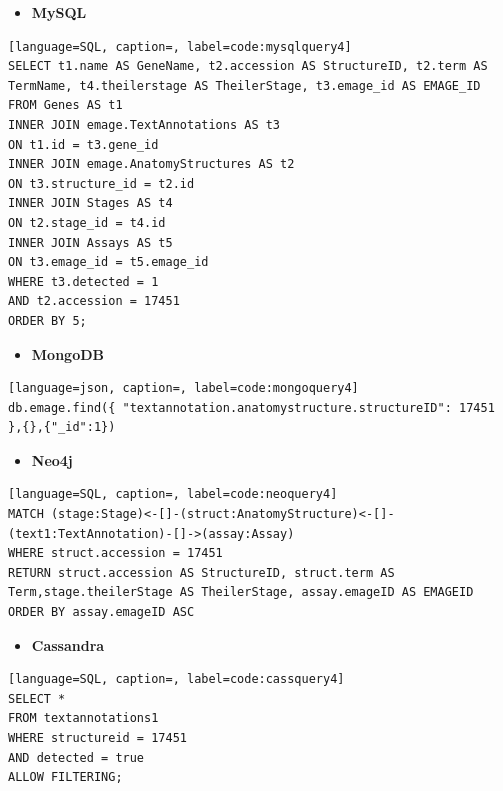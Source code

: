 \begin{itemize}[leftmargin=*]
\item \textbf{MySQL}
\end{itemize}

\begin{lstlisting}[language=SQL, caption=, label=code:mysqlquery4]
SELECT t1.name AS GeneName, t2.accession AS StructureID, t2.term AS TermName, t4.theilerstage AS TheilerStage, t3.emage_id AS EMAGE_ID
FROM Genes AS t1
INNER JOIN emage.TextAnnotations AS t3
ON t1.id = t3.gene_id
INNER JOIN emage.AnatomyStructures AS t2
ON t3.structure_id = t2.id
INNER JOIN Stages AS t4
ON t2.stage_id = t4.id
INNER JOIN Assays AS t5
ON t3.emage_id = t5.emage_id
WHERE t3.detected = 1
AND t2.accession = 17451
ORDER BY 5;
\end{lstlisting}

\begin{itemize}[leftmargin=*]
\item \textbf{MongoDB}
\end{itemize}

\begin{lstlisting}[language=json, caption=, label=code:mongoquery4]
db.emage.find({ "textannotation.anatomystructure.structureID": 17451 },{},{"_id":1})
\end{lstlisting}

\begin{itemize}[leftmargin=*]
\item \textbf{Neo4j}
\end{itemize}

\begin{lstlisting}[language=SQL, caption=, label=code:neoquery4]
MATCH (stage:Stage)<-[]-(struct:AnatomyStructure)<-[]-(text1:TextAnnotation)-[]->(assay:Assay)
WHERE struct.accession = 17451
RETURN struct.accession AS StructureID, struct.term AS Term,stage.theilerStage AS TheilerStage, assay.emageID AS EMAGEID
ORDER BY assay.emageID ASC
\end{lstlisting}

\begin{itemize}[leftmargin=*]
\item \textbf{Cassandra}
\end{itemize}

\begin{lstlisting}[language=SQL, caption=, label=code:cassquery4]
SELECT *
FROM textannotations1
WHERE structureid = 17451
AND detected = true
ALLOW FILTERING;
\end{lstlisting}

